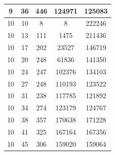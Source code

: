 \documentclass[a4paper,14pt]{extarticle}
\begin{document}
\begin{enumerate}[1.]
\begin{tabular}{|c|c|c|c|c|}
              9                                  & 36                                & 446                                     & 124971        & 125083 \\
              \hline
              10                                 & 10                                & 8                                       & 8             & 222246 \\
              \hline
              10                                 & 13                                & 111                                     & 1475          & 211436 \\
              \hline
              10                                 & 17                                & 202                                     & 23527         & 146719 \\
              \hline
              10                                 & 20                                & 248                                     & 61836         & 141350 \\
              \hline
              10                                 & 24                                & 247                                     & 102376        & 134103 \\
              \hline
              10                                 & 27                                & 248                                     & 110193        & 123522 \\
              \hline
              10                                 & 31                                & 238                                     & 117785        & 121892 \\
              \hline
              10                                 & 34                                & 274                                     & 123179        & 124767 \\
              \hline
              10                                 & 38                                & 357                                     & 170638        & 171228 \\
              \hline
              10                                 & 41                                & 325                                     & 167164        & 167356 \\
              \hline
              10                                 & 45                                & 306                                     & 159020        & 159064 \\
              \hline
          \end{tabular}


\end{enumerate}
\end{document}
